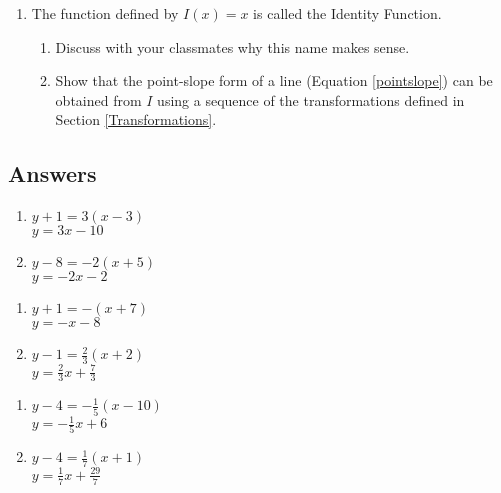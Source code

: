 \begin{enumerate}
\item \label{identityexercise} The function defined by $I(x) = x$ is called the  Identity Function. 

\begin{enumerate}

\item Discuss with your classmates why this name makes sense.
\item Show that the point-slope form of a line (Equation \ref{pointslope}) can be obtained from $I$ using a sequence of the transformations defined in Section \ref{Transformations}.

\end{enumerate}

\setcounter{HW}{\value{enumi}}
\end{enumerate}



\newpage

\subsection{Answers}

\begin{multicols}{2}
\begin{enumerate}

\item $y+1 = 3(x-3)$ \\ $y = 3x-10$
\item $y-8 = -2(x+5)$ \\ $y = -2x-2$

\setcounter{HW}{\value{enumi}}
\end{enumerate}
\end{multicols}

\begin{multicols}{2}
\begin{enumerate}
\setcounter{enumi}{\value{HW}}

\item $y + 1 = -(x+7)$ \\ $y = -x-8$
\item $y - 1 = \frac{2}{3} (x+2)$ \\ $y = \frac{2}{3} x + \frac{7}{3}$

\setcounter{HW}{\value{enumi}}
\end{enumerate}
\end{multicols}

\begin{multicols}{2}
\begin{enumerate}
\setcounter{enumi}{\value{HW}}

\item $y - 4 = -\frac{1}{5} (x-10)$ \\ $y = -\frac{1}{5} x + 6$
\item $y - 4 = \frac{1}{7}(x + 1)$ \\ $y = \frac{1}{7}x + \frac{29}{7}$


\setcounter{HW}{\value{enumi}}
\end{enumerate}
\end{multicols}

